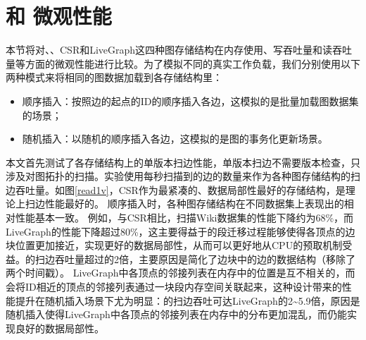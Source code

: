 \section{\store 和 \newstore 微观性能}
本节将对\store、\newstore、CSR和LiveGraph这四种图存储结构在内存使用、写吞吐量和读吞吐量等方面的微观性能进行比较。为了模拟不同的真实工作负载，我们分别使用以下两种模式来将相同的图数据加载到各存储结构里：
\begin{itemize}
    \item 顺序插入：按照边的起点的ID的顺序插入各边，这模拟的是批量加载图数据集的场景；
    \item 随机插入：以随机的顺序插入各边，这模拟的是图的事务化更新场景。
\end{itemize}

本文首先测试了各存储结构上的单版本扫边性能，单版本扫边不需要版本检查，只涉及对图拓扑的扫描。实验使用每秒扫描到的边的数量来作为各种图存储结构的扫边吞吐量。如图\ref{read1v}，CSR作为最紧凑的、数据局部性最好的存储结构，是理论上扫边性能最好的。
顺序插入时，各种图存储结构在不同数据集上表现出的相对性能基本一致。
例如，与CSR相比，\store 扫描Wiki数据集的性能下降约为68\%，而LiveGraph的性能下降超过80\%，这主要得益于\store 的段迁移过程能够使得各顶点的边块位置更加接近，实现更好的数据局部性，从而可以更好地从CPU的预取机制受益。\newstore 的扫边吞吐量超过\store 的2倍，主要原因是\newstore 简化了边块中的边的数据结构（移除了两个时间戳）。
LiveGraph中各顶点的邻接列表在内存中的位置是互不相关的，而\store 会将ID相近的顶点的邻接列表通过一块段内存空间关联起来，这种设计带来的性能提升在随机插入场景下尤为明显：\store 的扫边吞吐可达LiveGraph的2\textasciitilde 5.9倍，原因是随机插入使得LiveGraph中各顶点的邻接列表在内存中的分布更加混乱，而\store 仍能实现良好的数据局部性。

